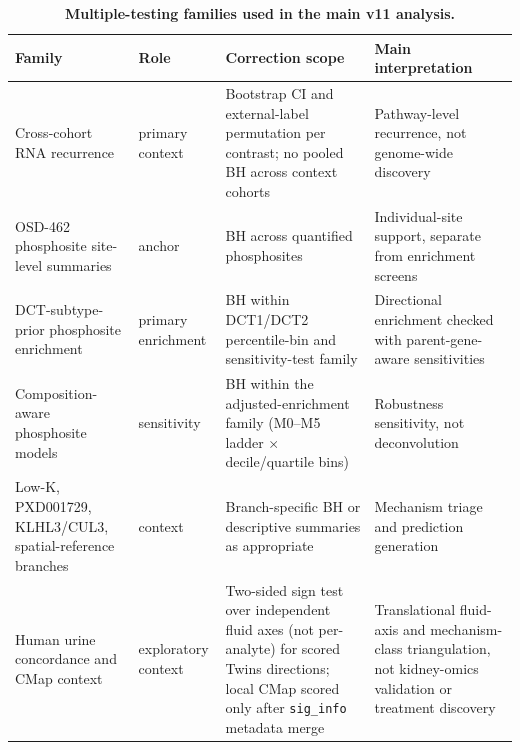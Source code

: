 \documentclass[11pt]{article}
\newcommand{\code}[1]{\texttt{#1}}
\begin{document}
\begin{table}[H]
\centering\footnotesize
\caption{\textbf{Multiple-testing families used in the main v11 analysis.}}
\label{tab:testingfamilies}
\begin{tabularx}{\textwidth}{p{}p{}Yp{0.18\textwidth}}
\toprule
Family & Role & Correction scope & Main interpretation \\
\midrule
Cross-cohort RNA recurrence & primary context & Bootstrap CI and external-label permutation per contrast; no pooled BH across context cohorts & Pathway-level recurrence, not genome-wide discovery \\
OSD-462 phosphosite site-level summaries & anchor & BH across quantified phosphosites & Individual-site support, separate from enrichment screens \\
DCT-subtype-prior phosphosite enrichment & primary enrichment & BH within DCT1/DCT2 percentile-bin and sensitivity-test family & Directional enrichment checked with parent-gene-aware sensitivities \\
Composition-aware phosphosite models & sensitivity & BH within the adjusted-enrichment family (M0--M5 ladder $\times$ decile/quartile bins) & Robustness sensitivity, not deconvolution \\
Low-K, PXD001729, KLHL3/CUL3, spatial-reference branches & context & Branch-specific BH or descriptive summaries as appropriate & Mechanism triage and prediction generation \\
Human urine concordance and CMap context & exploratory context & Two-sided sign test over independent fluid axes (not per-analyte) for scored Twins directions; local CMap scored only after \code{sig\_info} metadata merge & Translational fluid-axis and mechanism-class triangulation, not kidney-omics validation or treatment discovery \\
\bottomrule
\end{tabularx}
\end{table}
\end{document}
